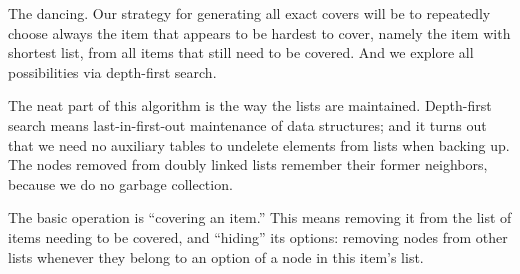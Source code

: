 The dancing.
Our strategy for generating all exact covers will be to repeatedly
choose always the item that appears to be hardest to cover, namely the
item with shortest list, from all items that still need to be covered.
And we explore all possibilities via depth-first search.

The neat part of this algorithm is the way the lists are maintained.
Depth-first search means last-in-first-out maintenance of data structures;
and it turns out that we need no auxiliary tables to undelete elements from
lists when backing up. The nodes removed from doubly linked lists remember
their former neighbors, because we do no garbage collection.

The basic operation is ``covering an item.'' This means removing it
from the list of items needing to be covered, and ``hiding'' its
options: removing nodes from other lists whenever they belong to an option of
a node in this item's list.

